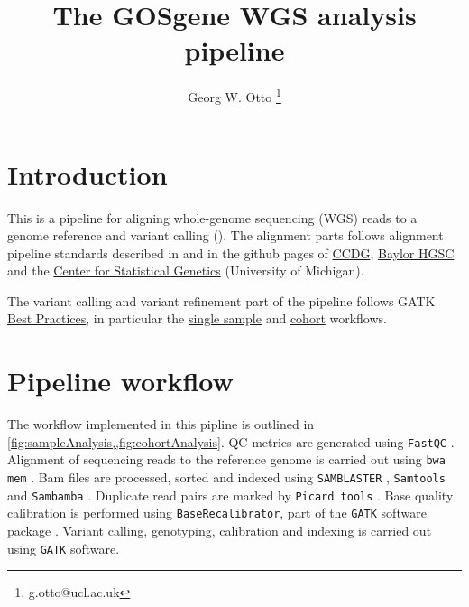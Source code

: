 \documentclass[a4paper]{article}
\title{The GOSgene WGS analysis pipeline}
\author{Georg W. Otto \thanks{g.otto@ucl.ac.uk}}
\affil{The UCL Institute of Child Health}
\begin{document}
\maketitle

\tableofcontents

\section{Introduction}
\label{sec:introduction}

This is a pipeline for aligning whole-genome sequencing (WGS) reads to
a genome reference and variant calling
(). The
alignment parts follows alignment pipeline standards described in
\citep{Regier2018Functionalequivalenceof} and in the github pages of
\href{https://github.com/CCDG/Pipeline-Standardization/blob/master/PipelineStandard.md}{CCDG},
\href{https://github.com/HGSC-NGSI/HgV_Protocol_Descriptions/blob/master/hgv_ccdg_resequencing.md}{Baylor
  HGSC} and the
\href{https://github.com/statgen/docker-alignment}{Center for
  Statistical Genetics} (University of Michigan).

The variant calling and variant refinement part of the pipeline
follows GATK
\href{https://software.broadinstitute.org/gatk/best-practices/workflow?id=11145}{Best
  Practices}, in particular the
\href{https://github.com/gatk-workflows/broad-prod-wgs-germline-snps-indels/blob/master/PairedEndSingleSampleWf.wdl}{single
  sample} and
\href{https://github.com/gatk-workflows/broad-prod-wgs-germline-snps-indels/blob/master/JointGenotypingWf.wdl}{cohort} workflows.


\section{Pipeline workflow}
\label{sec:pipeline-workflow}


The workflow implemented in this pipline is outlined in
\cref{fig:sampleAnalysis,,fig:cohortAnalysis}. QC metrics are
generated using \texttt{FastQC} \citep{2020FastQC}. Alignment of
sequencing reads to the reference genome is carried out using
\texttt{bwa mem} \citep{Li2013Aligningsequencereads}. Bam files are
processed, sorted and indexed using \texttt{SAMBLASTER}
\citep{Faust2014SAMBLASTERfastduplicate}, \texttt{Samtools}
\citep{Li2009SequenceAlignmentMapformat} and \texttt{Sambamba}
\citep{Tarasov2015Sambambafastprocessing}. Duplicate read pairs are
marked by \texttt{Picard tools} \citep{2020Picard}. Base quality
calibration is performed using \texttt{BaseRecalibrator}, part of the
\texttt{GATK} software package \citep{2020GATKGenomeAnalysis}. Variant
calling, genotyping, calibration and indexing is carried out using
\texttt{GATK} software.
\end{document}
